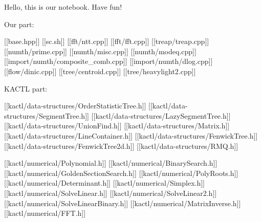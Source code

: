

Hello, this is our notebook. Have fun!

Our part:

[[base.hpp]]
[[sc.sh]]
[[fft/ntt.cpp]]
[[fft/fft.cpp]]
[[treap/treap.cpp]]
[[numth/prime.cpp]]
[[numth/misc.cpp]]
[[numth/modeq.cpp]]
[[import/numth/composite_comb.cpp]]
[[import/numth/dlog.cpp]]
[[flow/dinic.cpp]]
[[tree/centroid.cpp]]
[[tree/heavylight2.cpp]]

KACTL part:


[[kactl/data-structures/OrderStatisticTree.h]]
[[kactl/data-structures/SegmentTree.h]]
[[kactl/data-structures/LazySegmentTree.h]]
[[kactl/data-structures/UnionFind.h]]
[[kactl/data-structures/Matrix.h]]
[[kactl/data-structures/LineContainer.h]]
[[kactl/data-structures/FenwickTree.h]]
[[kactl/data-structures/FenwickTree2d.h]]
[[kactl/data-structures/RMQ.h]]

[[kactl/numerical/Polynomial.h]]
[[kactl/numerical/BinarySearch.h]]
[[kactl/numerical/GoldenSectionSearch.h]]
[[kactl/numerical/PolyRoots.h]]
[[kactl/numerical/Determinant.h]]
[[kactl/numerical/Simplex.h]]
[[kactl/numerical/SolveLinear.h]]
[[kactl/numerical/SolveLinear2.h]]
[[kactl/numerical/SolveLinearBinary.h]]
[[kactl/numerical/MatrixInverse.h]]
[[kactl/numerical/FFT.h]]

